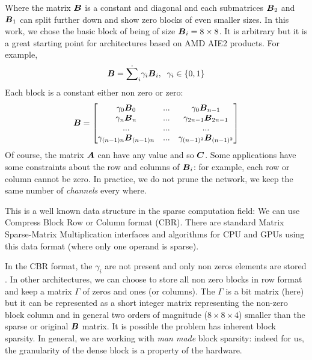 \documentclass[conference]{IEEEtran}
\begin{document}
Where the matrix ${\boldsymbol B}$ is a constant and diagonal and each
submatrices ${\boldsymbol B_2}$ and ${\boldsymbol B}_1$ can split further down and show
zero blocks of even smaller sizes. In this work, we chose the basic
block of being of size ${\boldsymbol B}_i = 8\times 8$. It is arbitrary but it
is a great starting point for architectures based on AMD AIE2
products.  For example,
\begin{equation}
  {\boldsymbol B} = \dot{\sum}_i \gamma_i {\boldsymbol B}_i, \;\; \gamma_i \in \{0,1\} 
\end{equation}
Each block is a constant either non zero or zero:
{\small \begin{equation*}
  {\boldsymbol B} = 
  \begin{bmatrix}
    \gamma_0{\boldsymbol B}_0   &  ... &   \gamma_0{\boldsymbol B}_{n-1} \\
    \gamma_n{\boldsymbol B}_{n} &  ... &   \gamma_{2n-1}{\boldsymbol B}_{2n-1} \\
    ...               &  ... &   ... \\
    \gamma_{(n-1)n}{\boldsymbol B}_{(n-1)n} & ... &   \gamma_{(n-1)^2}{\boldsymbol B}_{(n-1)^2} \\
  \end{bmatrix}
\end{equation*}}
Of course, the matrix ${\boldsymbol A}$ can have any value and so
${\boldsymbol C}$. Some applications have some constraints about the row and
columns of ${\boldsymbol B}_i$: for example, each row or column cannot be
zero. In practice, we do not prune the network, we keep the same
number of {\em channels} every where.

This is a well known data structure in the sparse computation field:
We can use Compress Block Row or Column format (CBR). There are
standard Matrix Sparse-Matrix Multiplication interfaces and algorithms
for CPU and GPUs using this data format (where only one operand is
sparse).

In the CBR format, the $\gamma_i$ are not present and only non zeros
elements are stored \cite{rocSPARSE,cuSPARSE}. In other architectures, we can
choose to store all non zero blocks in row format and keep a matrix
$\Gamma$ of zeros and ones (or columns). The $\Gamma$ is a bit matrix
(here) but it can be represented as a short integer matrix
representing the non-zero block column and in general two orders of
magnitude ($8\times 8 \times 4$) smaller than the sparse or original
${\boldsymbol B}$ matrix. It is possible the problem has inherent block
sparsity. In general, we are working with {\em man made} block
sparsity: indeed for us, the granularity of the dense block is a
property of the hardware.
\end{document}
